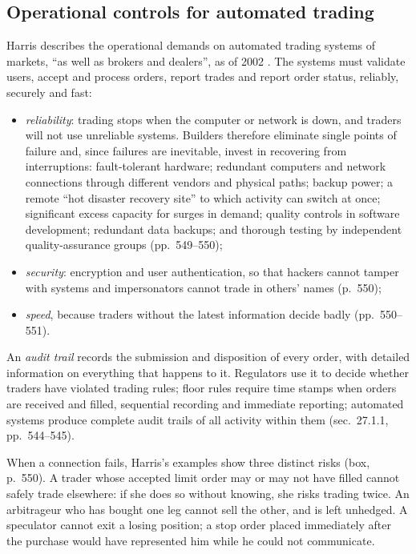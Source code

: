 \subsection{Operational controls for automated trading}

\begin{qfmethod}\label{meth:automated-trading-operational-controls}
 Harris describes the operational demands on automated trading systems of markets, ``as well as brokers and dealers'', as of 2002 \citep[chap.~``Floor Versus Automated Trading Systems'', sec.~27.7.1, pp.~549--551]{alpha-harris}. The systems must validate users, accept and process orders, report trades and report order status, reliably, securely and fast:
\begin{itemize}
\item \emph{reliability}: trading stops when the computer or network is down, and traders will not use unreliable systems. Builders therefore eliminate single points of failure and, since failures are inevitable, invest in recovering from interruptions: fault-tolerant hardware; redundant computers and network connections through different vendors and physical paths; backup power; a remote ``hot disaster recovery site'' to which activity can switch at once; significant excess capacity for surges in demand; quality controls in software development; redundant data backups; and thorough testing by independent quality-assurance groups (pp.~549--550);
\item \emph{security}: encryption and user authentication, so that hackers cannot tamper with systems and impersonators cannot trade in others' names (p.~550);
\item \emph{speed}, because traders without the latest information decide badly (pp.~550--551).
\end{itemize}
An \emph{audit trail} records the submission and disposition of every order, with detailed information on everything that happens to it. Regulators use it to decide whether traders have violated trading rules; floor rules require time stamps when orders are received and filled, sequential recording and immediate reporting; automated systems produce complete audit trails of all activity within them (sec.~27.1.1, pp.~544--545).

When a connection fails, Harris's examples show three distinct risks (box, p.~550). A trader whose accepted limit order may or may not have filled cannot safely trade elsewhere: if she does so without knowing, she risks trading twice. An arbitrageur who has bought one leg cannot sell the other, and is left unhedged. A speculator cannot exit a losing position; a stop order placed immediately after the purchase would have represented him while he could not communicate.


\end{qfmethod}
